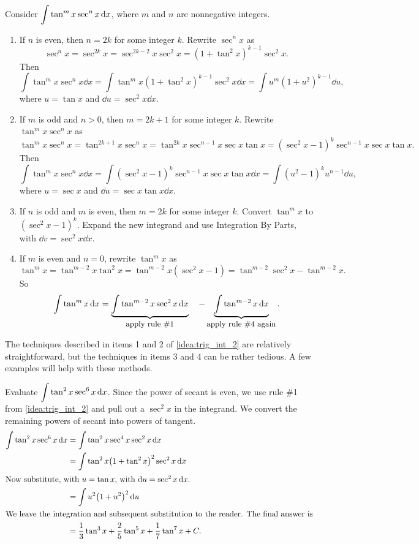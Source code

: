 {
\begin{keyidea}\label{idea:trig_int_2}%
Consider $\displaystyle\int\tan^mx\sec^nx\operatorname{d}\! x$, where $m$ and $n$ are nonnegative integers.
\begin{enumerate}
\item		If $n$ is even, then $n=2k$ for some integer $k$. Rewrite $\sec^nx$ as 
\[\sec^nx = \sec^{2k}x = \sec^{2k-2}x\sec^2x = (1+\tan^2x)^{k-1}\sec^2x.\]
Then
\[
\int\tan^mx\sec^nx\dd x=\int\tan^mx(1+\tan^2x)^{k-1}\sec^2x\dd x = \int u^m(1+u^2)^{k-1}\dd u,
\]
where $u = \tan x$ and $\dd u = \sec^2x\dd x$.

\item		If $m$ is odd and $n>0$, then $m=2k+1$ for some integer $k$. Rewrite $\tan^mx\sec^nx$ as
\[
\tan^mx\sec^nx = \tan^{2k+1}x\sec^nx = \tan^{2k}x\sec^{n-1}x\sec x\tan x = (\sec^2x-1)^k\sec^{n-1}x\sec x\tan x.
\]
Then
\[
\int\tan^mx\sec^nx\dd x=\int(\sec^2x-1)^k\sec^{n-1}x\sec x\tan x\dd x = \int(u^2-1)^ku^{n-1}\dd u,
\]
where $u = \sec x$ and $\dd u = \sec x\tan x\dd x$.

\item If $n$ is odd and $m$ is even, then $m=2k$ for some integer $k$. Convert $\tan^mx $ to $(\sec^2x-1)^k$. Expand the new integrand and use Integration By Parts, with $\dd v = \sec^2x\dd x$.

\item		If $m$ is even and $n=0$, rewrite $\tan^mx$ as
\[
\tan^mx = \tan^{m-2}x\tan^2x = \tan^{m-2}x(\sec^2x-1) = \tan^{m-2}\sec^2x-\tan^{m-2}x.
\]
So
\[
\int\tan^mx\operatorname{d}\! x = \underbrace{\int\tan^{m-2}x\sec^2x\operatorname{d}\! x}_{\text{\small apply rule \#1}}\quad - \underbrace{\int\tan^{m-2}x\operatorname{d}\! x}_{\text{\small apply rule \#4 again}}.
\]

\end{enumerate}
\end{keyidea}
}

The techniques described in items 1 and 2 of \autoref{idea:trig_int_2} are relatively straightforward, but the techniques in items 3 and 4 can be rather tedious. A few examples will help with these methods.

\begin{example}\label{ex_trigint5}%
Evaluate $\displaystyle\int \tan^2x\sec^6x\operatorname{d}\! x$.
\solution
Since the power of secant is even, we use rule \#1 from \autoref{idea:trig_int_2} and pull out a $\sec^2x$ in the integrand. We convert the remaining powers of secant into powers of tangent.
\begin{align*}
\int \tan^2x\sec^6x\operatorname{d}\! x &= \int\tan^2x\sec^4x\sec^2x\operatorname{d}\! x \\
		&= \int \tan^2x\bigl(1+\tan^2x\bigr)^2\sec^2x\operatorname{d}\! x \\
\intertext{Now substitute, with \(u=\tan x\), with \(\operatorname{d}\!u = \sec^2x\operatorname{d}\!x\).}
		&=\int u^2\bigl(1+u^2\bigr)^2\operatorname{d}\! u\\
\intertext{We leave the integration and subsequent substitution to the reader. The final answer is}
		&=\frac13\tan^3x+\frac25\tan^5x+\frac17\tan^7x+C.
\end{align*}
\end{example}

